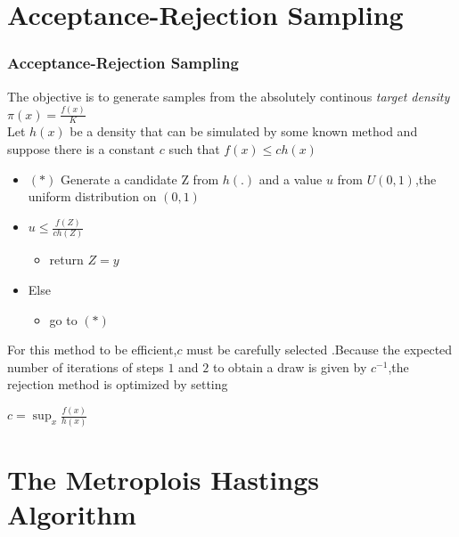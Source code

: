 \documentclass[hyperref={pdfpagelabels=false}]{beamer}
\begin{document}
\section{Acceptance-Rejection Sampling}
\begin{frame}
\frametitle{Acceptance-Rejection Sampling}
The objective is to generate samples from the  absolutely continous \textit{target density} $\pi(x)=\frac{f(x)}{K}$\\
Let $h(x)$ be a density that can be simulated by some known method and suppose there is a constant $c$ such that
$f(x)\leq ch(x)$
\begin{itemize}
\item $(*)$ Generate a candidate Z from $h(.)$ and a value $u$ from $U(0,1)$,the uniform distribution on $(0,1)$
\item $u\leq \frac{f(Z)}{ch(Z)}$
\begin{itemize}
\item return  $Z=y$
\end{itemize}
\item Else\\
\begin{itemize}
\item  go to $(*)$
\end{itemize}

\end{itemize}
\end{frame}

\begin{frame}
For this method to be efficient,$c$ must be carefully selected .Because the expected number of iterations of steps $1$ and $2$  to obtain a draw is given by $c^{-1}$,the rejection method is optimized by setting 

$
c=\sup_{x}\frac{f(x)}{h(x)}
$

\end{frame}

\section{The Metroplois Hastings Algorithm}

\end{document}
